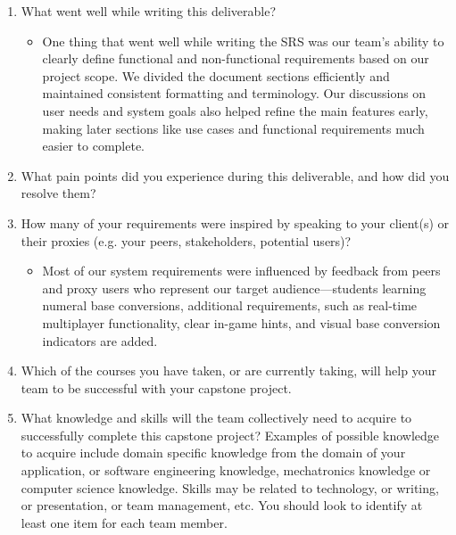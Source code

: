 \begin{enumerate}
  \item What went well while writing this deliverable?
  \begin{itemize}
  \item One thing that went well while writing the SRS was our team’s ability to clearly define
  functional and non-functional requirements based on our project scope.
  We divided the document sections efficiently and maintained consistent formatting and terminology.
  Our discussions on user needs and system goals also helped refine the main features early,
  making later sections like use cases and functional requirements much easier to complete.
  \end{itemize}

  \item What pain points did you experience during this deliverable, and how did
  you resolve them?
  \item How many of your requirements were inspired by speaking to your
  client(s) or their proxies (e.g. your peers, stakeholders, potential users)?
\begin{itemize}
\item Most of our system requirements were influenced by feedback from peers and proxy users who represent our target audience—students learning numeral base conversions, additional requirements, such as real-time multiplayer functionality, clear in-game hints, and visual base conversion indicators are added.
\end{itemize}
  \item Which of the courses you have taken, or are currently taking, will help
  your team to be successful with your capstone project.
  \item What knowledge and skills will the team collectively need to acquire to
  successfully complete this capstone project?  Examples of possible knowledge
  to acquire include domain specific knowledge from the domain of your
  application, or software engineering knowledge, mechatronics knowledge or
  computer science knowledge.  Skills may be related to technology, or writing,
  or presentation, or team management, etc.  You should look to identify at
  least one item for each team member.
\begin{itemize}


\end{itemize}
\end{enumerate}
